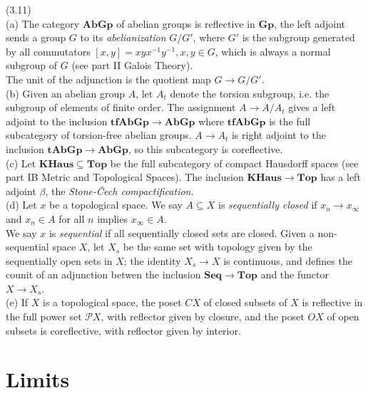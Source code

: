 \documentclass[a4paper]{article}
\begin{document}
\begin{eg} (3.11)\\
    (a) The category $\mathbf{AbGp}$ of abelian groups is reflective in $\mathbf{Gp}$, the left adjoint sends a group $G$ to its \emph{abelianization} $G/G'$, where $G'$ is the subgroup generated by all commutators $[x,y] =xyx^{-1}y^{-1}, x,y \in G$, which is always a normal subgroup of $G$ (see part II Galois Theory).\\
    The unit of the adjunction is the quotient map $G \to G/G'$.\\
    (b) Given an abelian group $A$, let $A_t$ denote the torsion subgroup, i.e. the subgroup of elements of finite order. The assignment $A \to A/A_t$ gives a left adjoint to the inclusion $\mathbf{tfAbGp} \to \mathbf{AbGp}$ where $\mathbf{tfAbGp}$ is the full subcategory of torsion-free abelian groups. $A \to A_t$ is right adjoint to the inclusion $\mathbf{tAbGp} \to \mathbf{AbGp}$, so this subcategory is coreflective.\\
    (c) Let $\mathbf{KHaus} \subseteq \mathbf{Top}$ be the full subcategory of compact Hausdorff spaces (see part IB Metric and Topological Spaces). The inclusion $\mathbf{KHaus} \to \mathbf{Top}$ has a left adjoint $\beta$, the \emph{Stone-Čech compactification}.\\
    (d) Let $x$ be a topological space. We say $A \subseteq X$ is \emph{sequentially closed} if $x_n \to x_\infty$ and $x_n \in A$ for all $n$ implies $x_\infty \in A$.\\
    We say $x$ is \emph{sequential} if all sequentially closed sets are closed. Given a non-sequential space $X$, let $X_s$ be the same set with topology given by the sequentially open sets in $X$; the identity $X_s \to X$ is continuous, and defines the counit of an adjunction betwen the inclusion $\mathbf{Seq} \to \mathbf{Top}$ and the functor $X \to X_s$.\\
    (e) If $X$ is a topological space, the poset $CX$ of closed subsets of $X$ is reflective in the full power set $\mathcal{P}X$, with reflector given by closure, and the poset $OX$ of open subsets is coreflective, with reflector given by interior.
\end{eg}

\newpage

\section{Limits}
\end{document}
